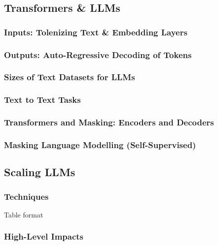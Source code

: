 \subsection{Transformers \& LLMs}
\begin{summary}
\end{summary}

\subsubsection{Inputs: Tolenizing Text \& Embedding Layers}

\subsubsection{Outputs: Auto-Regressive Decoding of Tokens}

\subsubsection{Sizes of Text Datasets for LLMs}

\subsubsection{Text to Text Tasks}

\subsubsection{Transformers and Masking: Encoders and Decoders}

\subsubsection{Masking Language Modelling (Self-Supervised)}
\newpage

\subsection{Scaling LLMs}
\begin{motivation}
    
\end{motivation}

\subsubsection{Techniques}
\begin{summary}
    Table format
\end{summary}

\subsubsection{High-Level Impacts}
\begin{summary}

\end{summary}